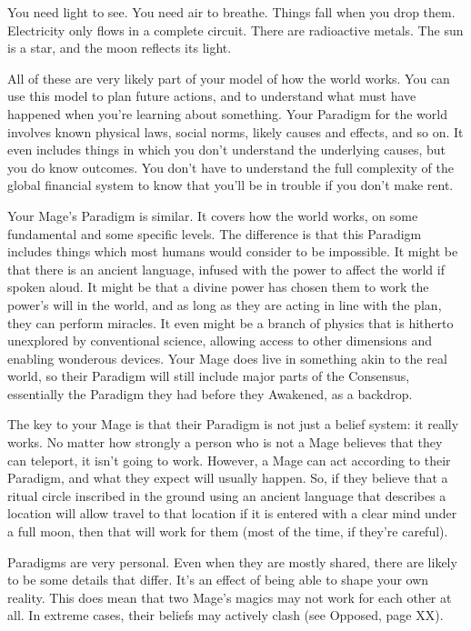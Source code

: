 \documentclass[
  oneside,
  statementpaper,
  9pt]{memoir}
\begin{document}
\begin{Player}

You need light to see. You need air to breathe. Things fall when you drop them. Electricity only flows in a complete circuit. There are radioactive metals. The sun is a star, and the moon reflects its light.

All of these are very likely part of your model of how the world works. You can use this model to plan future actions, and to understand what must have happened when you’re learning about something. Your Paradigm for the world involves known physical laws, social norms, likely causes and effects, and so on. It even includes things in which you don’t understand the underlying causes, but you do know outcomes. You don’t have to understand the full complexity of the global financial system to know that you’ll be in trouble if you don’t make rent.

Your Mage’s Paradigm is similar. It covers how the world works, on some fundamental and some specific levels. The difference is that this Paradigm includes things which most humans would consider to be impossible. It might be that there is an ancient language, infused with the power to affect the world if spoken aloud. It might be that a divine power has chosen them to work the power’s will in the world, and as long as they are acting in line with the plan, they can perform miracles. It even might be a branch of physics that is hitherto unexplored by conventional science, allowing access to other dimensions and enabling wonderous devices. Your Mage does live in something akin to the real world, so their Paradigm will still include major parts of the Consensus, essentially the Paradigm they had before they Awakened, as a backdrop.

The key to your Mage is that their Paradigm is not just a belief system: it really works. No matter how strongly a person who is not a Mage believes that they can teleport, it isn’t going to work. However, a Mage can act according to their Paradigm, and what they expect will usually happen. So, if they believe that a ritual circle inscribed in the ground using an ancient language that describes a location will allow travel to that location if it is entered with a clear mind under a full moon, then that will work for them (most of the time, if they’re careful).

Paradigms are very personal. Even when they are mostly shared, there are likely to be some details that differ. It’s an effect of being able to shape your own reality. This does mean that two Mage’s magics may not work for each other at all. In extreme cases, their beliefs may actively clash (see Opposed, page XX).


\end{Player}
\end{document}

